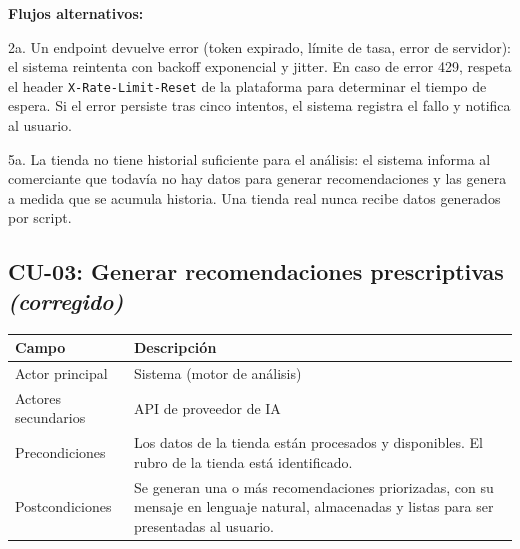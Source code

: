 \noindent\textbf{Flujos alternativos:}

\noindent 2a. Un endpoint devuelve error (token expirado, límite de tasa, error de servidor): el sistema reintenta con backoff exponencial y jitter. En caso de error 429, respeta el header \texttt{X-Rate-Limit-Reset} de la plataforma para determinar el tiempo de espera. Si el error persiste tras cinco intentos, el sistema registra el fallo y notifica al usuario.

\noindent 5a. La tienda no tiene historial suficiente para el análisis: el sistema informa al comerciante que todavía no hay datos para generar recomendaciones y las genera a medida que se acumula historia. Una tienda real nunca recibe datos generados por script.

\subsection{CU-03: Generar recomendaciones prescriptivas \textit{(corregido)}}
\label{sec:cu-03}

\begin{table}[h]
\centering
\renewcommand{\arraystretch}{1.3}
\begin{tabular}{|m{3cm}|m{11.3cm}|}
\hline
\textbf{Campo} & \textbf{Descripción} \\
\hline
Actor principal & Sistema (motor de análisis) \\
\hline
Actores secundarios & API de proveedor de IA \\
\hline
Precondiciones & Los datos de la tienda están procesados y disponibles. El rubro de la tienda está identificado. \\
\hline
Postcondiciones & Se generan una o más recomendaciones priorizadas, con su mensaje en lenguaje natural, almacenadas y listas para ser presentadas al usuario. \\
\hline
\end{tabular}
\end{table}

